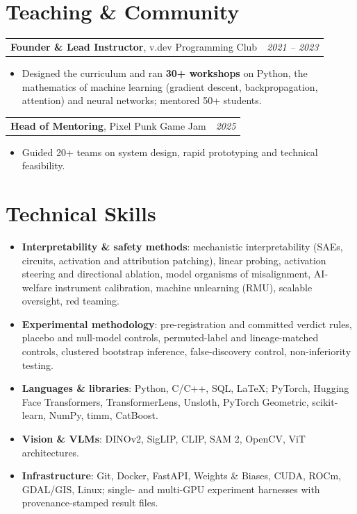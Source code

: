 \documentclass[letterpaper,10pt]{article}
\makeatletter
\newcommand{\cventry}[2]{%
    \begin{tabularx}{\textwidth}{@{}>{\raggedright\arraybackslash}X@{\hspace{8pt}}>{\raggedleft\arraybackslash}p{1.75in}@{}}
      #1 & \textit{\small #2}
    \end{tabularx}
}
\makeatother
\begin{document}
\section{Teaching \& Community}
\cventry{\textbf{Founder \& Lead Instructor}, v.dev Programming Club}{2021 -- 2023}
\begin{itemize}[leftmargin=0.2in, itemsep=1pt, topsep=2pt, parsep=0pt]
  \item \small Designed the curriculum and ran \textbf{30+ workshops} on Python, the mathematics of machine learning (gradient descent, backpropagation, attention) and neural networks; mentored 50+ students.
\end{itemize}
\vspace{3pt}
\cventry{\textbf{Head of Mentoring}, Pixel Punk Game Jam}{2025}
\begin{itemize}[leftmargin=0.2in, itemsep=1pt, topsep=2pt, parsep=0pt]
  \item \small Guided 20+ teams on system design, rapid prototyping and technical feasibility.
\end{itemize}

\section{Technical Skills}
\begin{itemize}[leftmargin=0.2in, label={}, itemsep=2pt, topsep=2pt, parsep=0pt]
  \item \small \textbf{Interpretability \& safety methods}: mechanistic interpretability (SAEs, circuits, activation and attribution patching), linear probing, activation steering and directional ablation, model organisms of misalignment, AI-welfare instrument calibration, machine unlearning (RMU), scalable oversight, red teaming.
  \item \small \textbf{Experimental methodology}: pre-registration and committed verdict rules, placebo and null-model controls, permuted-label and lineage-matched controls, clustered bootstrap inference, false-discovery control, non-inferiority testing.
  \item \small \textbf{Languages \& libraries}: Python, C/C++, SQL, \LaTeX; PyTorch, Hugging Face Transformers, TransformerLens, Unsloth, PyTorch Geometric, scikit-learn, NumPy, timm, CatBoost.
  \item \small \textbf{Vision \& VLMs}: DINOv2, SigLIP, CLIP, SAM 2, OpenCV, ViT architectures.
  \item \small \textbf{Infrastructure}: Git, Docker, FastAPI, Weights \& Biases, CUDA, ROCm, GDAL/GIS, Linux; single- and multi-GPU experiment harnesses with provenance-stamped result files.
\end{itemize}
\end{document}
